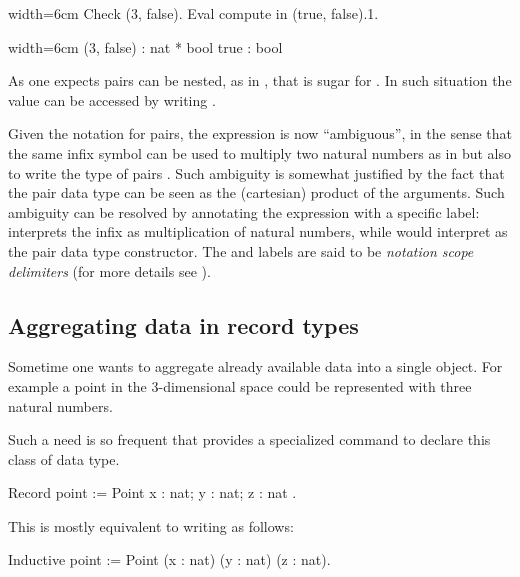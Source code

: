 \begin{coq}{}{width=6cm}
Check (3, false).
Eval compute in (true, false).1.
\end{coq}
\begin{coqout}{}{width=6cm}
(3, false) : nat * bool
true : bool
\end{coqout}
As one expects pairs can be nested, as in , that is sugar
for .  In such situation the value  can be
accessed by writing .

Given the notation for pairs, the expression  is now ``ambiguous'',
in the sense that the same infix \C{*} symbol can be used to multiply two
natural numbers as in  but also to write the type of pairs .  Such ambiguity is somewhat justified by the fact that the pair
data type can be seen as the (cartesian) product of the arguments.  Such
ambiguity can be resolved by annotating the expression with a specific
label:  interprets the infix \C{*} as multiplication of natural numbers,
while  would interpret \C{*} as the pair data type
constructor. The  and  labels are said to be
\emph{notation scope delimiters} (for more details see
\cite[section 12.2]{Coq:manual}).

\subsection{Aggregating data in record types}
\label{sec:records}

Sometime one wants to aggregate already available data into a single object.
For example a point in the 3-dimensional space could be represented with
three natural numbers.

Such a need is so frequent that \Coq{} provides a specialized command
to declare this class of data type.

\begin{coq}{}{}
Record point := Point { x : nat; y : nat; z : nat }.
\end{coq}
This is mostly equivalent to writing as follows:

\begin{coq}{}{}
Inductive point := Point (x : nat) (y : nat) (z : nat).
\end{coq}

